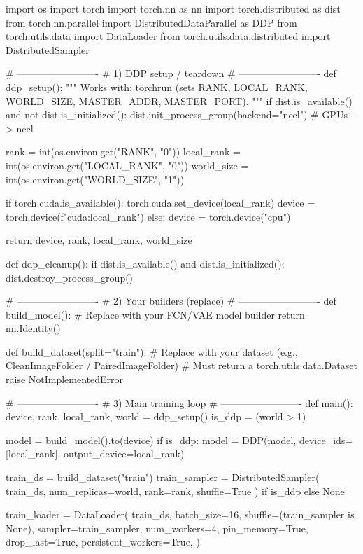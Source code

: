 \documentclass[11pt]{article}
\begin{document}
\begin{codeblock}[language=python,caption={Minimal PyTorch DDP training skeleton (\texttt{train\_ddp.py})}]
import os
import torch
import torch.nn as nn
import torch.distributed as dist
from torch.nn.parallel import DistributedDataParallel as DDP
from torch.utils.data import DataLoader
from torch.utils.data.distributed import DistributedSampler

# -------------------------
# 1) DDP setup / teardown
# -------------------------
def ddp_setup():
    """
    Works with: torchrun (sets RANK, LOCAL_RANK, WORLD_SIZE, MASTER_ADDR, MASTER_PORT).
    """
    if dist.is_available() and not dist.is_initialized():
        dist.init_process_group(backend="nccl")  # GPUs -> nccl

    rank = int(os.environ.get("RANK", "0"))
    local_rank = int(os.environ.get("LOCAL_RANK", "0"))
    world_size = int(os.environ.get("WORLD_SIZE", "1"))

    if torch.cuda.is_available():
        torch.cuda.set_device(local_rank)
        device = torch.device(f"cuda:{local_rank}")
    else:
        device = torch.device("cpu")

    return device, rank, local_rank, world_size

def ddp_cleanup():
    if dist.is_available() and dist.is_initialized():
        dist.destroy_process_group()

# -------------------------
# 2) Your builders (replace)
# -------------------------
def build_model():
    # Replace with your FCN/VAE model builder
    return nn.Identity()

def build_dataset(split="train"):
    # Replace with your dataset (e.g., CleanImageFolder / PairedImageFolder)
    # Must return a torch.utils.data.Dataset
    raise NotImplementedError

# -------------------------
# 3) Main training loop
# -------------------------
def main():
    device, rank, local_rank, world = ddp_setup()
    is_ddp = (world > 1)

    model = build_model().to(device)
    if is_ddp:
        model = DDP(model, device_ids=[local_rank], output_device=local_rank)

    train_ds = build_dataset("train")
    train_sampler = DistributedSampler(
        train_ds, num_replicas=world, rank=rank, shuffle=True
    ) if is_ddp else None

    train_loader = DataLoader(
        train_ds,
        batch_size=16,
        shuffle=(train_sampler is None),
        sampler=train_sampler,
        num_workers=4,
        pin_memory=True,
        drop_last=True,
        persistent_workers=True,
    )


\end{codeblock}
\end{document}
